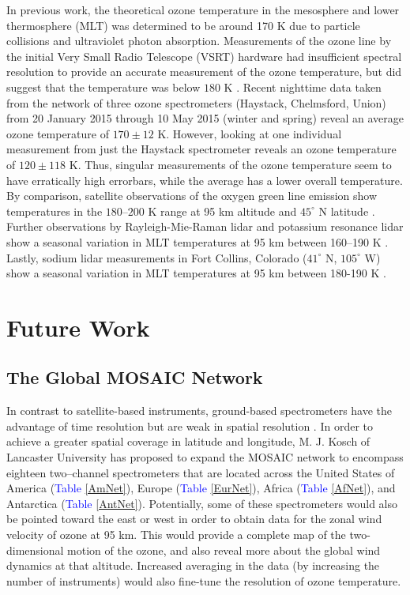 \documentclass[11pt]{article}
\begin{document}
In previous work, the theoretical ozone temperature in the mesosphere and lower thermosphere (MLT) was determined to be around 170 K due to particle collisions and ultraviolet photon absorption. Measurements of the ozone line by the initial Very Small Radio Telescope (VSRT) hardware had insufficient spectral resolution to provide an accurate measurement of the ozone temperature, but did suggest that the temperature was below $180$ K \cite{VSRT43}. Recent nighttime data taken from the network of three ozone spectrometers (Haystack, Chelmsford, Union) from 20 January 2015 through 10 May 2015 (winter and spring) reveal an average ozone temperature of $170\pm12$ K. However, looking at one individual measurement from just the Haystack spectrometer reveals an ozone temperature of $120\pm118$ K. Thus, singular measurements of the ozone temperature seem to have erratically high errorbars, while the average has a lower overall temperature. By comparison, satellite observations of the oxygen green line emission show temperatures in the $180$--$200$ K range at 95 km altitude and $45^\circ$ N latitude \cite{Gao2012}. Further observations by Rayleigh-Mie-Raman lidar and potassium resonance lidar show a seasonal variation in MLT temperatures at 95 km between 160--190 K \cite{Gerding2008}. Lastly, sodium lidar measurements in Fort Collins, Colorado ($41^\circ$ N, $105^\circ$ W) show a seasonal variation in MLT temperatures at 95 km between 180-190 K \cite{Yuan2008}.


\section{Future Work}	
\subsection{The Global MOSAIC Network}
In contrast to satellite-based instruments, ground-based spectrometers have the advantage of time resolution but are weak in spatial resolution \cite{Portnyagin2004}. In order to achieve a greater spatial coverage in latitude and longitude, M. J. Kosch of Lancaster University has proposed to expand the MOSAIC network to encompass eighteen two--channel spectrometers that are located across the United States of America (\textcolor{blue}{Table} \ref{AmNet}), Europe (\textcolor{blue}{Table} \ref{EurNet}), Africa (\textcolor{blue}{Table} \ref{AfNet}), and Antarctica (\textcolor{blue}{Table} \ref{AntNet}). Potentially, some of these spectrometers would also be pointed toward the east or west in order to obtain data for the zonal wind velocity of ozone at 95 km. This would provide a complete map of the two-dimensional motion of the ozone, and also reveal more about the global wind dynamics at that altitude. Increased averaging in the data (by increasing the number of instruments) would also fine-tune the resolution of ozone temperature.\newline
\end{document}
